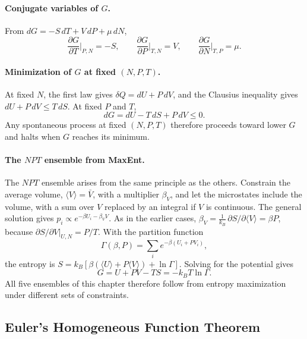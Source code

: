 \paragraph{Conjugate variables of $G$.}
From $dG=-S\,dT+V\,dP+\mu\,dN$,
\begin{equation}
    \boxed{\frac{\partial G}{\partial T}\bigg|_{P,N}=-S,\qquad
    \frac{\partial G}{\partial P}\bigg|_{T,N}=V,\qquad
    \frac{\partial G}{\partial N}\bigg|_{T,P}=\mu.}
\end{equation}

\paragraph{Minimization of $G$ at fixed $(N,P,T)$.}
At fixed $N$, the first law gives $\delta Q=dU+P\,dV$, and the Clausius
inequality gives $dU+P\,dV\leq T\,dS$. At fixed $P$ and $T$,
\begin{equation}
    \boxed{dG=dU-T\,dS+P\,dV\leq0.}
\end{equation}
Any spontaneous process at fixed $(N,P,T)$ therefore proceeds toward lower
$G$ and halts when $G$ reaches its minimum.

\paragraph{The $NPT$ ensemble from MaxEnt.}
The $NPT$ ensemble arises from the same principle as the others. Constrain
the average volume, $\langle V\rangle=\bar V$, with a multiplier $\beta_V$, and
let the microstates include the volume, with a sum over $V$ replaced by an
integral if $V$ is continuous. The general solution gives
$p_i\propto e^{-\beta U_i-\beta_V V}$. As in the earlier cases,
$\beta_V=\frac{1}{k_B}\,\partial S/\partial\langle V\rangle=\beta P$, because
$\partial S/\partial V|_{U,N}=P/T$. With the partition function
\begin{equation*}
    \Gamma(\beta,P)=\sum_i e^{-\beta(U_i+PV_i)},
\end{equation*}
the entropy is $S=k_B[\beta(\langle U\rangle+P\langle V\rangle)+\ln\Gamma]$.
Solving for the potential gives
\begin{equation}
    \boxed{G=U+PV-TS=-k_BT\ln\Gamma.}
\end{equation}
All five ensembles of this chapter therefore follow from entropy maximization
under different sets of constraints.

\subsection{Euler's Homogeneous Function Theorem}


